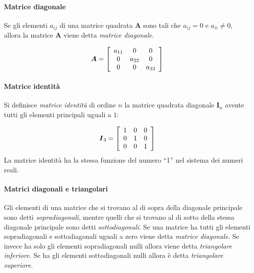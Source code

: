 \paragraph{Matrice diagonale}

Se gli elementi $a_{ij}$ di una matrice quadrata $\boldsymbol{A}$
sono tali che $a_{ij} =0$ e $a_{ii} \neq 0$, allora la matrice
$\boldsymbol{A}$ viene detta \emph{matrice diagonale}.

\begin{displaymath}
\boldsymbol{A} =  \left[ \begin{array}{c c c}
a_{11} & 0 & 0\\
0 & a_{22} & 0\\
0 & 0 & a_{33} \end{array} \right]
\end{displaymath}

\paragraph{Matrice identità}

Si definisce \emph{matrice identit{\`a}} di ordine $n$ la
matrice quadrata diagonale $\boldsymbol{I}_n$ avente tutti gli
elementi principali uguali a $1$:

\begin{displaymath}
\boldsymbol{I}_3 =  \left[ \begin{array}{c c c}
1 & 0 & 0\\
0 & 1 & 0\\
0 & 0 & 1 \end{array} \right]
\end{displaymath}
La matrice identit{\`a} ha la stessa funzione del numero ``1'' nel
sistema dei numeri reali.

\paragraph{Matrici diagonali e triangolari}

Gli elementi di una matrice che si trovano al di sopra della
diagonale principale sono detti  \emph{sopradiagonali}, mentre
quelli che si trovano al di sotto della stessa diagonale
principale sono detti \emph{sottodiagonali}.  Se una matrice ha tutti gli elementi
sopradiagonali e sottodiagonali uguali a zero viene detta
\emph{matrice diagonale}.  Se invece ha solo gli elementi sopradiagonali nulli allora
viene detta \emph{triangolare inferiore}. Se ha gli elementi sottodiagonali nulli allora {\`e} detta \emph{triangolare superiore}.

